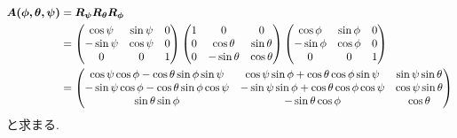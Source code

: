 \begin{align}
 \bm{A(\phi,\theta,\psi)}
 &= \bm{R_{\psi}}\bm{R_{\theta}}\bm{R_{\phi}}
 \notag
 \\
 & =
 \begin{pmatrix}
    \cos\psi & \sin\psi & 0 \\ -\sin\psi & \cos\psi & 0 \\ 0 & 0 & 1
 \end{pmatrix}
 \begin{pmatrix}
    1 & 0 & 0 \\ 0 & \cos\theta & \sin\theta \\ 0 & -\sin\theta & \cos\theta
 \end{pmatrix}
 \begin{pmatrix}
    \cos\phi & \sin\phi & 0 \\ -\sin\phi & \cos\phi & 0 \\ 0 & 0 & 1
 \end{pmatrix}
 \notag
 \\
 & =
 \begin{pmatrix}
   \cos\psi \cos\phi - \cos\theta \sin\phi \sin\psi &  \cos\psi \sin\phi + \cos\theta \cos\phi \sin\psi  & \sin\psi \sin\theta \\
  -\sin\psi \cos\phi - \cos\theta \sin\phi \cos\psi & -\sin\psi \sin\phi + \cos\theta \cos\phi \cos\psi & \cos\psi \sin\theta  \\
  \sin\theta \sin\phi & -\sin\theta\cos\phi & \cos\theta
 \end{pmatrix}
 \label{eq:RigidBodyMD4}
\end{align}
と求まる. 

